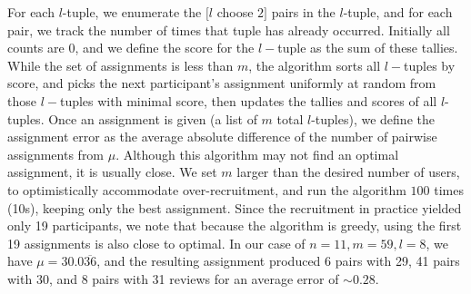 For each $l$-tuple, we enumerate the $[l$ choose $2]$ pairs in the $l$-tuple, and for each pair, we track the number of times that tuple has already occurred. 
Initially all counts are 0, and we define the score for the $l-$tuple as the sum of these tallies. 
While the set of assignments is less than $m$, the algorithm sorts all $l-$tuples by score, and picks the next participant's assignment uniformly at random from those $l-$tuples with minimal score, then updates the tallies and scores of all $l$-tuples. 
Once an assignment is given (a list of $m$ total $l$-tuples), we define the assignment error as the average absolute difference of the number of pairwise assignments from $\mu$. 
Although this algorithm may not find an optimal assignment, it is usually close.%
We set $m$ larger than the desired number of users, to optimistically accommodate over-recruitment, and run the algorithm $100$ times (10s), keeping only the best assignment. 
Since the recruitment in practice yielded only 19 participants, we note that because the algorithm is greedy, using the first 19 assignments is also close to optimal. 
In our case of $n = 11, m = 59, l = 8$, we have $\mu = 30.0\overline{36}$, and the resulting assignment produced 6 pairs with 29, 41 pairs with 30, and 8 pairs with 31 reviews for an average error of $\sim0.28$. 

